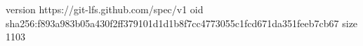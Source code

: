 version https://git-lfs.github.com/spec/v1
oid sha256:f893a983b05a430f2ff379101d1d1b8f7cc4773055c1fcd671da351feeb7cb67
size 1103
